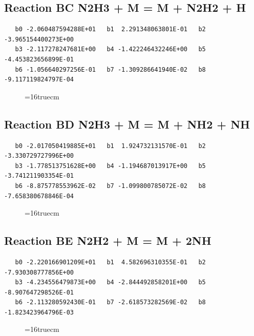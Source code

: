 \documentclass[12pt,dvipdfm]{article}
\begin{document}
\subsection{
Reaction BC N2H3 + M = M + N2H2 + H }
\begin{small}\begin{verbatim}
   b0 -2.060487594288E+01   b1  2.291348063801E-01   b2 -3.965154400273E+00
   b3 -2.117278247681E+00   b4 -1.422246432246E+00   b5 -4.453823656899E-01
   b6 -1.056640297256E-01   b7 -1.309286641940E-02   b8 -9.117119824797E-04
\end{verbatim}\end{small}
\begin{figure}[h!] \label{n2rates}
\epsfxsize=16truecm
\end{figure}
\newpage

\subsection{
Reaction BD N2H3 + M = M + NH2 + NH }
\begin{small}\begin{verbatim}
   b0 -2.017050419885E+01   b1  1.924732131570E-01   b2 -3.330729727996E+00
   b3 -1.778513751628E+00   b4 -1.194687013917E+00   b5 -3.741211903354E-01
   b6 -8.875778553962E-02   b7 -1.099800785072E-02   b8 -7.658380678846E-04
\end{verbatim}\end{small}
\begin{figure}[h!] \label{n2rates}
\epsfxsize=16truecm
\end{figure}
\newpage

\subsection{
Reaction BE N2H2 + M = M + 2NH }
\begin{small}\begin{verbatim}
   b0 -2.220166901209E+01   b1  4.582696310355E-01   b2 -7.930308777856E+00
   b3 -4.234556479873E+00   b4 -2.844492858201E+00   b5 -8.907647298526E-01
   b6 -2.113280592430E-01   b7 -2.618573282569E-02   b8 -1.823423964796E-03
\end{verbatim}\end{small}
\begin{figure}[h!] \label{n2rates}
\epsfxsize=16truecm
\end{figure}
\newpage
\end{document}
